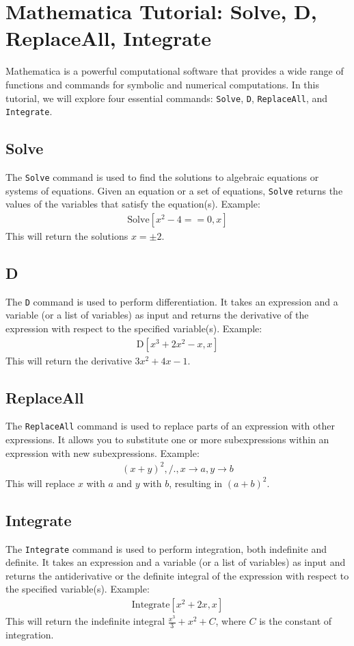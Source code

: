 \documentclass[10pt]{article}
\begin{document}
\section*{Mathematica Tutorial: Solve, D, ReplaceAll, Integrate}
Mathematica is a powerful computational software that provides a wide range of functions and commands for symbolic and numerical computations. In this tutorial, we will explore four essential commands: \texttt{Solve}, \texttt{D}, \texttt{ReplaceAll}, and \texttt{Integrate}.
\subsection*{Solve}
The \texttt{Solve} command is used to find the solutions to algebraic equations or systems of equations. Given an equation or a set of equations, \texttt{Solve} returns the values of the variables that satisfy the equation(s).
Example:
\begin{align*}
\text{Solve}[x^2 - 4 == 0, x]
\end{align*}
This will return the solutions $x = \pm 2$.
\subsection*{D}
The \texttt{D} command is used to perform differentiation. It takes an expression and a variable (or a list of variables) as input and returns the derivative of the expression with respect to the specified variable(s).
Example:
\begin{align*}
\text{D}[x^3 + 2x^2 - x, x]
\end{align*}
This will return the derivative $3x^2 + 4x - 1$.
\subsection*{ReplaceAll}
The \texttt{ReplaceAll} command is used to replace parts of an expression with other expressions. It allows you to substitute one or more subexpressions within an expression with new subexpressions.
Example:
\begin{align*}
(x + y)^2 , \text{/.} , x \to a, y \to b
\end{align*}
This will replace $x$ with $a$ and $y$ with $b$, resulting in $(a + b)^2$.
\subsection*{Integrate}
The \texttt{Integrate} command is used to perform integration, both indefinite and definite. It takes an expression and a variable (or a list of variables) as input and returns the antiderivative or the definite integral of the expression with respect to the specified variable(s).
Example:
\begin{align*}
\text{Integrate}[x^2 + 2x, x]
\end{align*}
This will return the indefinite integral $\frac{x^3}{3} + x^2 + C$, where $C$ is the constant of integration.
\end{document}
